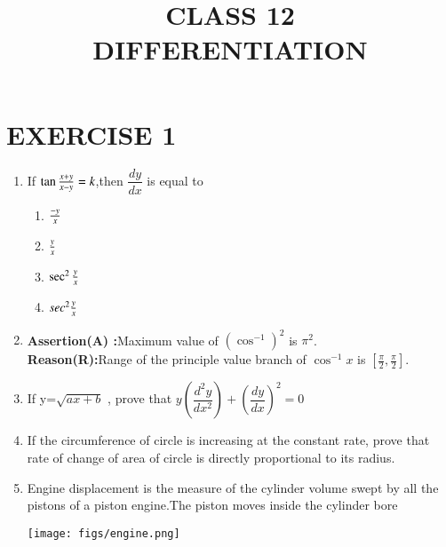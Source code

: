 \documentclass{article}
\begin{document}
\title{CLASS 12\\DIFFERENTIATION}
\date{}
\maketitle
\section{EXERCISE 1}
\begin{enumerate}
	\item If $\tan{{x+y}\over{x-y}}=k$,then $\dfrac{dy}{dx}$ is equal to 
		\begin{enumerate}
			\item ${{-y}\over{x}}$
			\item ${{y}\over{x}}$
			\item $\sec^2{{y}\over{x}}$
			\item $\-sec^2{{y}\over{x}}$
		\end{enumerate}
\item  \textbf{Assertion(A) :}Maximum value of $({\cos^{-1}})^2$ is ${{\pi}^2}$.\\
  \textbf{Reason(R):}Range of the principle value branch of ${{\cos^{-1}x}}$ is $[{\frac{\pi}{2}},{\frac{\pi}{2}}]$.\\
	\item If y=$\sqrt{ax+b}$ , prove that $y(\dfrac{d^2y}{dx^2})+(\dfrac{dy}{dx})^2=0$ \\
 \item If the circumference of circle is increasing at the constant rate, prove that rate of change of area of circle is directly proportional to its radius.
 \item Engine displacement is the measure of the cylinder volume swept by all the pistons of a piston engine.The piston moves inside the cylinder bore
 
     \texttt{[image: figs/engine.png]}
    \vspace{0.5cm}
 

\end{enumerate}
\end{document}
